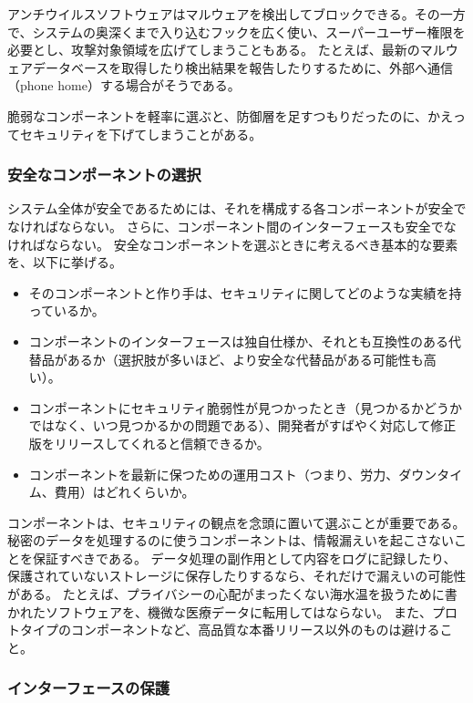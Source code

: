 \documentclass[uplatex]{jsarticle}
\def\label#1{}%
\begin{document}
\begin{exa}[アンチウイルスソフトウェア]\label{exa:ch13-antivirus}
アンチウイルスソフトウェアはマルウェアを検出してブロックできる。その一方で、システムの奥深くまで入り込むフックを広く使い、スーパーユーザー権限を必要とし、攻撃対象領域を広げてしまうこともある。
たとえば、最新のマルウェアデータベースを取得したり検出結果を報告したりするために、外部へ通信（phone home）する場合がそうである。
\end{exa}

脆弱なコンポーネントを軽率に選ぶと、防御層を足すつもりだったのに、かえってセキュリティを下げてしまうことがある。

\subsubsection{安全なコンポーネントの選択}

システム全体が安全であるためには、それを構成する各コンポーネントが安全でなければならない。
さらに、コンポーネント間のインターフェースも安全でなければならない。
安全なコンポーネントを選ぶときに考えるべき基本的な要素を、以下に挙げる。
\begin{itemize}
\item そのコンポーネントと作り手は、セキュリティに関してどのような実績を持っているか。
\item コンポーネントのインターフェースは独自仕様か、それとも互換性のある代替品があるか（選択肢が多いほど、より安全な代替品がある可能性も高い）。
\item コンポーネントにセキュリティ脆弱性が見つかったとき（見つかるかどうかではなく、いつ見つかるかの問題である）、開発者がすばやく対応して修正版をリリースしてくれると信頼できるか。
\item コンポーネントを最新に保つための運用コスト（つまり、労力、ダウンタイム、費用）はどれくらいか。
\end{itemize}

コンポーネントは、セキュリティの観点を念頭に置いて選ぶことが重要である。
秘密のデータを処理するのに使うコンポーネントは、情報漏えいを起こさないことを保証すべきである。
データ処理の副作用として内容をログに記録したり、保護されていないストレージに保存したりするなら、それだけで漏えいの可能性がある。
たとえば、プライバシーの心配がまったくない海水温を扱うために書かれたソフトウェアを、機微な医療データに転用してはならない。
また、プロトタイプのコンポーネントなど、高品質な本番リリース以外のものは避けること。

\subsubsection{インターフェースの保護}
\end{document}
